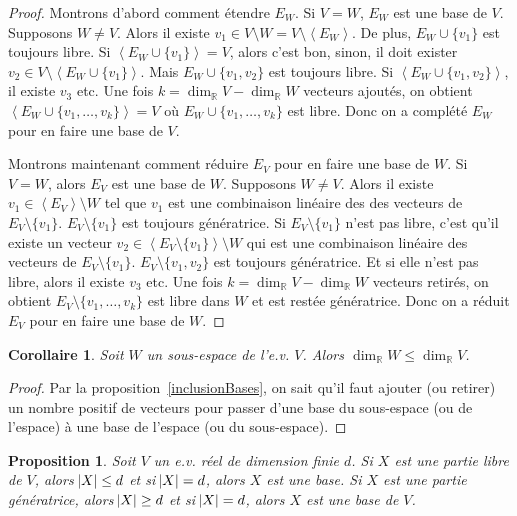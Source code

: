 \documentclass{article}
\newcommand{\R}{\mathbb R}
\newcommand{\eng}[1]{\left\langle#1\right\rangle}
\newtheorem{prp}[thm]{Proposition}
\newtheorem{cor}[thm]{Corollaire}
\theoremstyle{definition}
\theoremstyle{remark}
\begin{document}
		\begin{proof} Montrons d'abord comment étendre $E_W$. Si $V=W$, $E_W$ est une base de $V$. Supposons $W \neq V$. Alors il existe $v_1 \in V \setminus W =
		V \setminus \eng {E_W}$. De plus, $E_W \cup \{v_1\}$ est toujours libre. Si $\eng {E_W \cup \{v_1\}} = V$, alors c'est bon, sinon, il doit exister
		$v_2 \in V \setminus \eng {E_W \cup \{v_1\}}$. Mais $E_W \cup \{v_1, v_2\}$ est toujours libre. Si $\eng {E_W \cup \{v_1, v_2\}}$, il existe $v_3$ etc.
		Une fois $k = \dim_\R V - \dim_\R W$ vecteurs ajoutés, on obtient $\eng {E_W \cup \{v_1, \ldots, v_k\}} = V$ où $E_W \cup \{v_1, \ldots, v_k\}$ est libre.
		Donc on a complété $E_W$ pour en faire une base de $V$.

		Montrons maintenant comment réduire $E_V$ pour en faire une base de $W$. Si $V=W$, alors $E_V$ est une base de $W$. Supposons $W \neq V$. Alors il existe
		$v_1 \in \eng {E_V} \setminus W$ tel que $v_1$ est une combinaison linéaire des des vecteurs de $E_V \setminus \{v_1\}$. $E_V \setminus \{v_1\}$ est toujours
		génératrice. Si $E_V \setminus \{v_1\}$ n'est pas libre, c'est qu'il existe un vecteur $v_2 \in \eng {E_V \setminus \{v_1\}} \setminus W$ qui est une combinaison
		linéaire des vecteurs de $E_V \setminus \{v_1\}$. $E_V \setminus \{v_1, v_2\}$ est toujours génératrice. Et si elle n'est pas libre, alors il existe $v_3$ etc. Une
		fois $k=\dim_\R V-\dim_\R W$ vecteurs retirés, on obtient $E_V \setminus \{v_1, \ldots, v_k\}$ est libre dans $W$ et est restée génératrice. Donc on a réduit
		$E_V$ pour en faire une base de $W$. \end{proof}

		\begin{cor} Soit $W$ un sous-espace de l'e.v. $V$. Alors $\dim_\R W \leq \dim_\R V$. \end{cor}

		\begin{proof} Par la proposition~\ref{inclusionBases}, on sait qu'il faut ajouter (ou retirer) un nombre positif de vecteurs pour passer d'une base du sous-espace (ou
		de l'espace) à une base de l'espace (ou du sous-espace). \end{proof}

		\begin{prp} Soit $V$ un e.v. réel de dimension finie $d$. Si $X$ est une partie libre de $V$, alors $\abs X \leq d$ et si $\abs X = d$, alors $X$ est une base. Si $X$
		est une partie génératrice, alors $\abs X \geq d$ et si $\abs X = d$, alors $X$ est une base de $V$. \end{prp}
\end{document}
